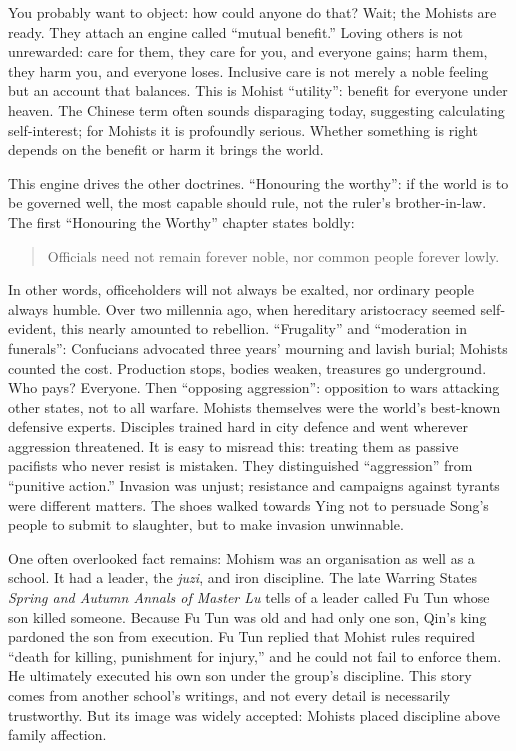 You probably want to object: how could anyone do that? Wait; the Mohists are ready. They attach an engine called ``mutual benefit.'' Loving others is not unrewarded: care for them, they care for you, and everyone gains; harm them, they harm you, and everyone loses. Inclusive care is not merely a noble feeling but an account that balances. This is Mohist ``utility'': benefit for everyone under heaven. The Chinese term often sounds disparaging today, suggesting calculating self-interest; for Mohists it is profoundly serious. Whether something is right depends on the benefit or harm it brings the world.

This engine drives the other doctrines. ``Honouring the worthy'': if the world is to be governed well, the most capable should rule, not the ruler's brother-in-law. The first ``Honouring the Worthy'' chapter states boldly:

\begin{quote}
Officials need not remain forever noble, nor common people forever lowly.
\end{quote}
In other words, officeholders will not always be exalted, nor ordinary people always humble. Over two millennia ago, when hereditary aristocracy seemed self-evident, this nearly amounted to rebellion. ``Frugality'' and ``moderation in funerals'': Confucians advocated three years' mourning and lavish burial; Mohists counted the cost. Production stops, bodies weaken, treasures go underground. Who pays? Everyone. Then ``opposing aggression'': opposition to wars attacking other states, not to all warfare. Mohists themselves were the world's best-known defensive experts. Disciples trained hard in city defence and went wherever aggression threatened. It is easy to misread this: treating them as passive pacifists who never resist is mistaken. They distinguished ``aggression'' from ``punitive action.'' Invasion was unjust; resistance and campaigns against tyrants were different matters. The shoes walked towards Ying not to persuade Song's people to submit to slaughter, but to make invasion unwinnable.

One often overlooked fact remains: Mohism was an organisation as well as a school. It had a leader, the \textit{juzi}, and iron discipline. The late Warring States \textit{Spring and Autumn Annals of Master Lu} tells of a leader called Fu Tun whose son killed someone. Because Fu Tun was old and had only one son, Qin's king pardoned the son from execution. Fu Tun replied that Mohist rules required ``death for killing, punishment for injury,'' and he could not fail to enforce them. He ultimately executed his own son under the group's discipline. This story comes from another school's writings, and not every detail is necessarily trustworthy. But its image was widely accepted: Mohists placed discipline above family affection.

